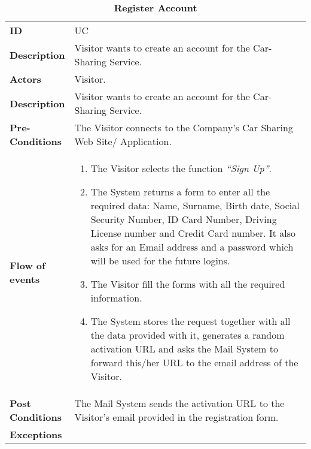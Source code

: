 \documentclass[12pt]{article}
\begin{document}



\begin{longtable}{|p{0.2\linewidth} p{0.8\linewidth}|}
	\captionsetup{labelformat=empty} %
	\caption{\textbf{Register Account}} %
	\label{UC_Register}%
	\\ \hline %
	
	\textbf{ID} & UC\theUseCaseIdCounter \\ \hline
	\textbf{Description} & Visitor wants to create an account for the Car-Sharing Service. \\ \hline
	\textbf{Actors} & Visitor.\\ \hline
	\textbf{Description} & Visitor wants to create an account for the Car-Sharing Service. \\ \hline
	\textbf{Pre-Conditions} & The Visitor connects to the Company's Car Sharing Web Site/ Application. \\ \hline
	\textbf{Flow of events} & 
		\begin{enumerate}
			\item The Visitor selects the function \textit{\textquotedblleft{Sign Up}\textquotedblright}.
			\item The System returns a form to enter all the required data: Name, Surname, Birth date, Social Security Number, ID Card Number, Driving License number and Credit Card number. It also asks for an Email address and a password which will be used for the future logins.
			\item The Visitor fill the forms with all the required information.
			\item The System stores the request together with all the data provided with it, generates a random activation URL and asks the Mail System to forward this/her URL to the email address of the Visitor.
		\end{enumerate}	 \\ \hline
	\textbf{Post Conditions} & The Mail System sends the activation URL to the Visitor's email provided in the registration form. \\ \hline
	\textbf{Exceptions} & 

\end{longtable}
\end{document}
